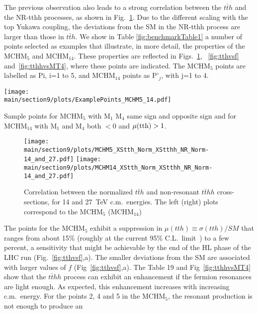 The previous observation also leads to a strong correlation between the $t\bar{t}h$ and the NR-tthh processes, as shown in Fig.~\ref{fig:nrtthhvstth}. Due to the different scaling with the top Yukawa coupling, the deviations from the SM in the NR-tthh process are larger than those in $t\bar{t}h$.
\label{benchmarks}
We show in Table \ref{fig:benchmarkTable1} 
a number of points selected as examples that illustrate, in
more detail, the properties of the MCHM$_5$ and MCHM$_{14}$.  
These properties are reflected in Figs.~\ref{fig:nrtthhvstth}, ~\ref{fig:tthvsf} and~\ref{fig:tthhvsMT4}, where these points are indicated. The MCHM$_5$ points are labelled as Pi, i=1 to 5, and MCHM$_{14}$ points as P'$_j$, with j=1 to 4.
%
\begin{table}[t]
\centering
\texttt{[image: \\main/section9/plots/ExamplePoints\_MCHM5\_14.pdf]}
\caption{Sample points for MCHM$_5$ with M$_1$ M$_4$ same sign and opposite sign and for MCHM$_{14}$ with M$_1$ and M$_4$ both $<0$ and $\mu({\rm tth})>1$.}
\label{fig:benchmarkTable1}
\end{table}
%
\begin{figure}[t]
\centering
\texttt{[image: \\main/section9/plots/MCHM5\_XStth\_Norm\_XStthh\_NR\_Norm-14\_and\_27.pdf]}
\hspace{1cm}
\texttt{[image: \\main/section9/plots/MCHM14\_XStth\_Norm\_XStthh\_NR\_Norm-14\_and\_27.pdf]}
\caption{Correlation between the normalized $t\bar{t}h$ and
non-resonant $t\bar{t}hh$ cross-sections, for 14 and 27~TeV c.m.~energies. The left (right) plots correspond to the MCHM$_5$ (MCHM$_{14}$)}
\label{fig:nrtthhvstth}
\end{figure}
%
The points for the MCHM$_5$ exhibit a suppression in $\mu(tth) \equiv
\sigma(tth)/SM$ that ranges from about 15\% (roughly at the current
95\% C.L.~limit~\cite{Aaboud:2018urx, Sirunyan:2018hoz}) to a few
percent, a sensitivity that might be achievable by the end of the HL
phase of the LHC run (Fig.~\ref{fig:tthvsf},a).  The smaller deviations from the SM are
associated with larger values of $f$ (Fig~\ref{fig:tthvsf},a).  The Table 19 and Fig~\ref{fig:tthhvsMT4} show that the
$t\bar{t}hh$ process can exhibit an enhancement if the fermion
resonances are light enough.  As expected, this enhancement increases
with increasing c.m.~energy. For the points 2, 4 and 5 in the MCHM$_{5}$, the resonant production is not enough to produce an
